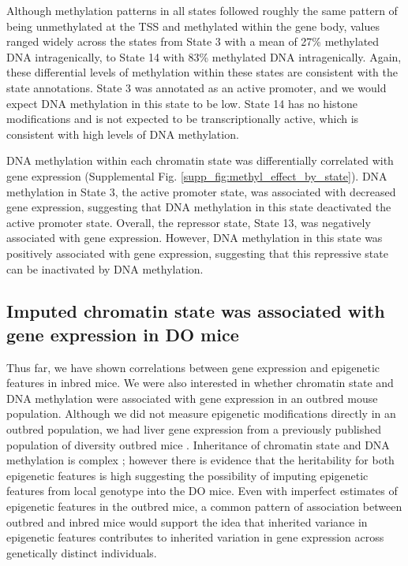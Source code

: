 \documentclass[
  11pt,
]{article}
\begin{document}
Although methylation patterns in all states followed roughly the same
pattern of being unmethylated at the TSS and methylated within the gene
body, values ranged widely across the states from State 3 with a mean of
27\% methylated DNA intragenically, to State 14 with 83\% methylated DNA
intragenically. Again, these differential levels of methylation within
these states are consistent with the state annotations. State 3 was
annotated as an active promoter, and we would expect DNA methylation in
this state to be low. State 14 has no histone modifications and is not
expected to be transcriptionally active, which is consistent with high
levels of DNA methylation.

DNA methylation within each chromatin state was differentially
correlated with gene expression (Supplemental Fig.
\ref{supp_fig:methyl_effect_by_state}). DNA methylation in State 3, the
active promoter state, was associated with decreased gene expression,
suggesting that DNA methylation in this state deactivated the active
promoter state. Overall, the repressor state, State 13, was negatively
associated with gene expression. However, DNA methylation in this state
was positively associated with gene expression, suggesting that this
repressive state can be inactivated by DNA methylation.

\hypertarget{imputed-chromatin-state-was-associated-with-gene-expression-in-do-mice}{%
\subsection{Imputed chromatin state was associated with gene expression
in DO
mice}\label{imputed-chromatin-state-was-associated-with-gene-expression-in-do-mice}}

Thus far, we have shown correlations between gene expression and
epigenetic features in inbred mice. We were also interested in whether
chromatin state and DNA methylation were associated with gene expression
in an outbred mouse population. Although we did not measure epigenetic
modifications directly in an outbred population, we had liver gene
expression from a previously published population of diversity outbred
mice \citep{pmid28592500}. Inheritance of chromatin state and DNA
methylation is complex \citep{rintisch2014natural}; however there is
evidence that the heritability for both epigenetic features is high
\citep{pmid16009939,pmid33931130} suggesting the possibility of imputing
epigenetic features from local genotype into the DO mice. Even with
imperfect estimates of epigenetic features in the outbred mice, a common
pattern of association between outbred and inbred mice would support the
idea that inherited variance in epigenetic features contributes to
inherited variation in gene expression across genetically distinct
individuals.
\end{document}

